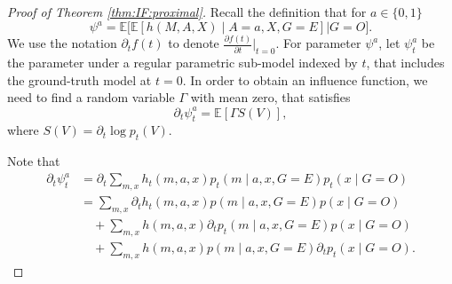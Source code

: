 \documentclass[10pt]{article}
\newcommand{\E}{\mathbb{E}}
\begin{document}
\begin{proof}[Proof of Theorem \ref{thm:IF:proximal}]

Recall the definition that for $a\in\{0,1\}$ 
\[
\psi^a=
\E\big[\E[h(M,A,X)\mid A=a,X,G=E]\big|  G=O\big].
\]
We use the notation $\partial_tf(t)$ to denote $\frac{\partial f(t)}{\partial t}\big|_{t=0}$.
For parameter $\psi^a$, let $\psi^a_t$ be the parameter under a regular parametric sub-model indexed by $t$, that includes the ground-truth model at $t=0$.
In order to obtain an influence function, we need to find a random variable $\Gamma$ with mean zero, that satisfies
\[
\partial_t\psi^a_t=\E[\Gamma S(V)],
\]
where $S(V)=\partial_t\log p_t(V)$.

Note that
\begin{equation}
\label{eq:IF:proxa1}
\begin{aligned}
\partial_t\psi^a_t
&=\partial_t \sum_{m,x} h_t(m,a,x)p_t(m\mid a,x,G=E)p_t(x\mid G=O)\\
&= \sum_{m,x} \partial_t h_t(m,a,x)p(m\mid a,x,G=E)p(x\mid G=O) \\
&\quad+ \sum_{m,x} h(m,a,x)\partial_t p_t(m\mid a,x,G=E)p(x\mid G=O)\\
&\quad+ \sum_{m,x} h(m,a,x)p(m\mid a,x,G=E)\partial_t p_t(x\mid G=O).
\end{aligned}
\end{equation}


\end{proof}
\end{document}
